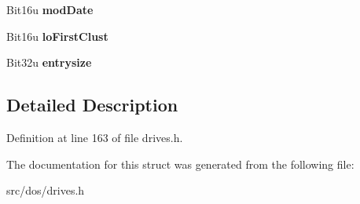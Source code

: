 \begin{DoxyCompactItemize}
\item 
\hypertarget{structdirentry_af01ffd8f98a8a32a2c261715e210d17e}{Bit16u {\bfseries mod\-Date}}\label{structdirentry_af01ffd8f98a8a32a2c261715e210d17e}

\item 
\hypertarget{structdirentry_a944ec49c9135d06dea4f8cb2b1c04875}{Bit16u {\bfseries lo\-First\-Clust}}\label{structdirentry_a944ec49c9135d06dea4f8cb2b1c04875}

\item 
\hypertarget{structdirentry_ab5b8d6dd3afa5f72dbd04eeee2f2973b}{Bit32u {\bfseries entrysize}}\label{structdirentry_ab5b8d6dd3afa5f72dbd04eeee2f2973b}

\end{DoxyCompactItemize}


\subsection{Detailed Description}


Definition at line 163 of file drives.\-h.



The documentation for this struct was generated from the following file\-:\begin{DoxyCompactItemize}
\item 
src/dos/drives.\-h\end{DoxyCompactItemize}
